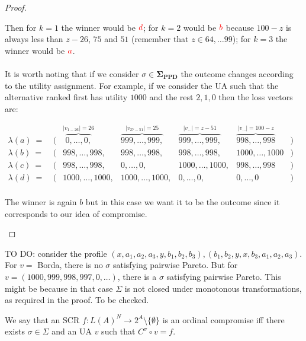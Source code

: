 \documentclass[version=3.21, pagesize, notitlepage, twoside=off, bibliography=totoc, DIV=calc, fontsize=12pt, a4paper]{scrartcl}
\begin{document}
\begin{proof}
\begin{example}
	Then for $k=1$ the winner would be $\color{red}d$; for $k=2$ would be $\color{red}b$ because $100-z$ is always less than $z-26$, $75$ and $51$ (remember that $z \in {64, \dots 99}$); for $k=3$ the winner would be $\color{red}a$.
	\\\\
	It is worth noting that if we consider $\sigma \in \mathbf{\Sigma_\text{PPD}}$ the outcome changes according to the utility assignment. For example, if we consider the UA such that the alternative ranked first has utility $1000$ and the rest $2,1,0$ then the loss vectors are: 
	\begin{center}
		$
		\begin{array}{ccccccc}
		\lambda(a)\ = \ &(& \overbrace{0, \dots,0,}^{|v_{1-26}|=26} & \overbrace{999, \dots, 999,}^{|v_{27-51}|=25} & \overbrace{999, \dots, 999,}^{|v_{\dots}|=z-51} & \overbrace{998, \dots, 998}^{|v_{\dots}|=100-z} &) \\
		\lambda(b)\ = \ &(& 998, \dots,998, & 998, \dots, 998, & 998, \dots, 998, & 1000, \dots, 1000 &) \\
		\lambda(c)\ = \ &(& 998, \dots,998, & 0, \dots, 0, & 1000, \dots, 1000, & 998, \dots, 998 &) \\
		\lambda(d)\ = \ &(& 1000, \dots,1000, & 1000, \dots, 1000, & 0, \dots, 0, & 0, \dots, 0 &) \\
		\end{array}
		$
	\end{center}
	The winner is again $b$ but in this case we want it to be the outcome since it corresponds to our idea of compromise.
\end{example}

\end{proof}

TO DO: consider the profile $(x, a_1, a_2, a_3, y, b_1, b_2, b_3), (b_1, b_2, y, x, b_3, a_1, a_2, a_3)$. For $v = $ Borda, there is no $\sigma$ satisfying pairwise Pareto. But for $v = (1000, 999, 998, 997, 0, …)$, there is a $\sigma$ satisfying pairwise Pareto. This might be because in that case $\Sigma$ is not closed under monotonous transformations, as required in the proof. To be checked.

\begin{definition}
\label{D1} \bigskip We say that an SCR $f:L(A)^{N}\rightarrow 2^{A} \setminus \{\emptyset \}$ is an ordinal compromise iff there exists $\sigma \in \Sigma $ and an UA $v$ such that $C^{\sigma }\circ v=f$.
\end{definition}
\end{document}
